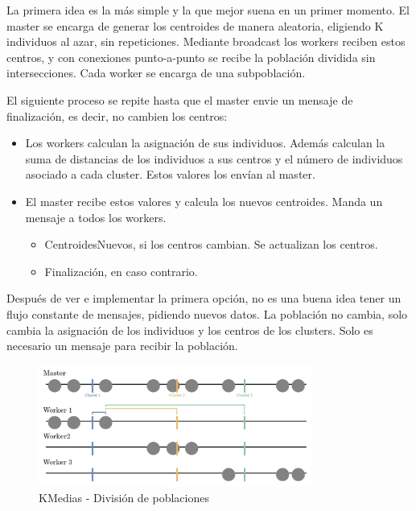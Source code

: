 		La primera idea es la más simple y la que mejor suena en un primer momento. El master se encarga de generar los centroides de manera aleatoria, eligiendo K individuos al azar, sin repeticiones. Mediante broadcast los workers reciben estos centros, y con conexiones punto-a-punto se recibe la población dividida sin intersecciones. Cada worker se encarga de una subpoblación. 
		
		
		
		\begin{mdframed}[roundcorner=5pt]
			El siguiente proceso se repite hasta que el master envie un mensaje de finalización, es decir, no cambien los centros:	
			\begin{itemize}
				\setlength\itemsep{0em} %
				\item Los workers calculan la asignación de sus individuos. Además calculan la suma de distancias de los individuos a sus centros y el número de individuos asociado a cada cluster. Estos valores los envían al master.
				\item El master recibe estos valores y calcula los nuevos centroides. Manda un mensaje a todos los workers. 
				\begin{itemize}
					\setlength\itemsep{0em} %
					\item CentroidesNuevos, si los centros cambian. Se actualizan los centros.
					\item Finalización, en caso contrario.
				\end{itemize}
			\end{itemize}
		\end{mdframed}
		
	
		
		Después de ver e implementar la primera opción, no es una buena idea tener un flujo constante de mensajes, pidiendo nuevos datos. La población no cambia, solo cambia la asignación de los individuos y los centros de los clusters. Solo es necesario un mensaje para recibir la población.
		
		
		\begin{figure}
			\centering
			\includegraphics[width=0.8\textwidth]{images/chapter_3/kmedias_mpi}	
			\caption{KMedias - División de poblaciones}
			\label{fig:kmediasdiv}
		\end{figure}
		
